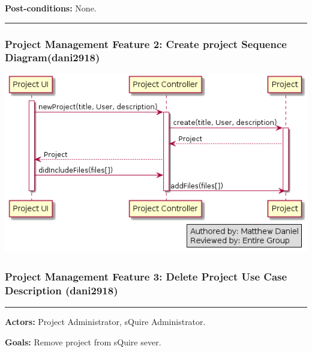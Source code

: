 \documentclass[twoside,letterpaper]{article}
\begin{document}
 \noindent  \textbf{Post-conditions:} None. \newline

\vspace{8pt}
\hrule

\vspace{20pt}

\newpage

\subsubsection[Project Management Feature 2: Create project Sequence Diagram (dani2918)]{\rmfamily\bfseries\color{black}
	Project Management Feature 2: Create project Sequence Diagram(dani2918)}

\bigskip

\includegraphics[width=\textwidth]{images/SequenceDiagrams/PMCreateProject.png}

\newpage


\subsubsection[Project Management Feature 3: Delete Project Use Case Description (dani2918)]{\rmfamily\bfseries\color{black}
	Project Management Feature 3: Delete Project Use Case Description (dani2918)}
\hypertarget{RefHeading22059017292}{}
\bigskip

\vspace{2pt}
\hrule
\vspace{8pt}
 \noindent \textbf{Actors:} Project Administrator, sQuire Administrator. \newline
 
 \noindent \textbf{Goals:} Remove project from sQuire sever. \newline
\end{document}
